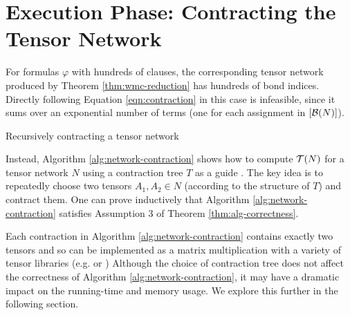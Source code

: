 \section{Execution Phase: Contracting the Tensor Network}
\label{sec:tensors:execution}
For formulas $\varphi$ with hundreds of clauses, the corresponding tensor network produced by Theorem \ref{thm:wmc-reduction} has hundreds of bond indices. Directly following Equation \ref{eqn:contraction} in this case is infeasible, since it sums over an exponential number of terms (one for each assignment in $[\mathcal{B}(N)]$).

\begin{algorithm*}[t]
    \label{alg:network-contraction}
    \caption{Recursively contracting a tensor network}
    
    \DontPrintSemicolon
\end{algorithm*}

Instead, Algorithm \ref{alg:network-contraction} shows how to compute $\mathcal{T}(N)$ for a tensor network $N$ using a contraction tree $T$ as a guide \cite{EP14}. The key idea is to repeatedly choose two tensors $A_1, A_2 \in N$ (according to the structure of $T$) and contract them. One can prove inductively that Algorithm \ref{alg:network-contraction} satisfies Assumption 3 of Theorem \ref{thm:alg-correctness}.

Each contraction in Algorithm \ref{alg:network-contraction} contains exactly two tensors and so can be implemented as a matrix multiplication with a variety of tensor libraries (e.g.  \cite{numpy} or  \cite{ABCCDDDGII16})
Although the choice of contraction tree does not affect the correctness of Algorithm \ref{alg:network-contraction}, it may have a dramatic impact on the running-time and memory usage. We explore this further in the following section.

